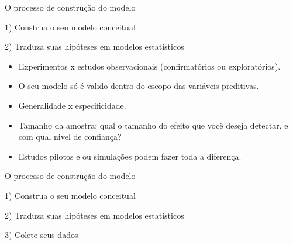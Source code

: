 \documentclass{beamer}\usepackage[]{graphicx}\usepackage[]{color}
\begin{document}
\begin{frame}[t]{O processo de construção do modelo}
\begin{small}

1) Construa o seu modelo conceitual

2) Traduza suas hipóteses em modelos estatísticos
\vfill
\begin{itemize}

\item Experimentos x estudos observacionais (confirmatórios ou exploratórios). \pause
\vfill
\item O seu modelo só é valido dentro do escopo das variáveis preditivas. \pause
\vfill
\item Generalidade x especificidade. \pause
\vfill
\item Tamanho da amostra: qual o tamanho do efeito que você deseja detectar, e com qual nivel de confiança? \pause
\vfill
\item Estudos pilotos e ou simulações podem fazer toda a diferença.

\end{itemize}

\end{small}
\end{frame}

\begin{frame}[t]{O processo de construção do modelo}
\begin{small}

1) Construa o seu modelo conceitual

2) Traduza suas hipóteses em modelos estatísticos

3) Colete seus dados

\end{small}
\end{frame}
\end{document}
